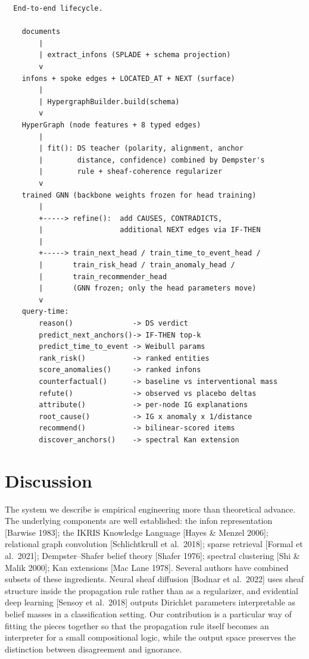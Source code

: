 \documentclass[11pt,a4paper]{article}
\begin{document}
\begin{verbatim}
  End-to-end lifecycle.

    documents
        |
        | extract_infons (SPLADE + schema projection)
        v
    infons + spoke edges + LOCATED_AT + NEXT (surface)
        |
        | HypergraphBuilder.build(schema)
        v
    HyperGraph (node features + 8 typed edges)
        |
        | fit(): DS teacher (polarity, alignment, anchor
        |        distance, confidence) combined by Dempster's
        |        rule + sheaf-coherence regularizer
        v
    trained GNN (backbone weights frozen for head training)
        |
        +-----> refine():  add CAUSES, CONTRADICTS,
        |                  additional NEXT edges via IF-THEN
        |
        +-----> train_next_head / train_time_to_event_head /
        |       train_risk_head / train_anomaly_head /
        |       train_recommender_head
        |       (GNN frozen; only the head parameters move)
        v
    query-time:
        reason()              -> DS verdict
        predict_next_anchors()-> IF-THEN top-k
        predict_time_to_event -> Weibull params
        rank_risk()           -> ranked entities
        score_anomalies()     -> ranked infons
        counterfactual()      -> baseline vs interventional mass
        refute()              -> observed vs placebo deltas
        attribute()           -> per-node IG explanations
        root_cause()          -> IG x anomaly x 1/distance
        recommend()           -> bilinear-scored items
        discover_anchors()    -> spectral Kan extension
\end{verbatim}

\section{Discussion}

The system we describe is empirical engineering more than
theoretical advance. The underlying components are well
established: the infon representation [Barwise 1983]; the
IKRIS Knowledge Language [Hayes \& Menzel 2006]; relational
graph convolution [Schlichtkrull et al.\ 2018]; sparse
retrieval [Formal et al.\ 2021]; Dempster--Shafer belief
theory [Shafer 1976]; spectral clustering [Shi \& Malik 2000];
Kan extensions [Mac Lane 1978]. Several authors have combined
subsets of these ingredients. Neural sheaf diffusion [Bodnar
et al.\ 2022] uses sheaf structure inside the propagation rule
rather than as a regularizer, and evidential deep learning
[Sensoy et al.\ 2018] outputs Dirichlet parameters
interpretable as belief masses in a classification setting.
Our contribution is a particular way of fitting the pieces
together so that the propagation rule itself becomes an
interpreter for a small compositional logic, while the output
space preserves the distinction between disagreement and
ignorance.
\end{document}
